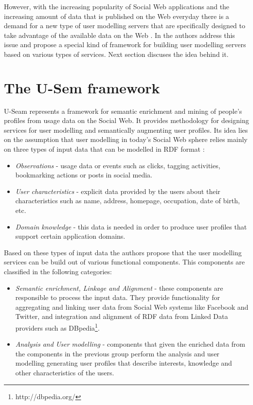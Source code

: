 However, with the increasing popularity of Social Web applications and the increasing amount of data that is published on the Web everyday there is a demand for a new type of user modelling servers that are specifically designed to take advantage of the available data on the Web \cite{brusilovsky2007adaptive}. In \cite{abel2011u} the authors address this issue and propose a special kind of framework for building user modelling servers based on various types of services. Next section discuses the idea behind it.

\section{The U-Sem framework}
U-Seam represents a framework for semantic enrichment and mining of people's profiles from usage data on the Social Web. It provides methodology for designing services for user modelling and semantically augmenting user profiles. Its idea lies on the assumption that user modelling in today's Social Web sphere relies mainly on three types of input data \cite{abel2011u} that can be modelled in RDF format \cite{miller1998introduction}:

\begin{itemize}
	\item \textit{Observations} - usage data or events such as clicks, tagging activities, bookmarking actions or posts in social media.
	
	\item \textit{User characteristics} - explicit data provided by the users about their characteristics such as name, address, homepage, occupation, date of birth, etc.
	
	\item \textit{Domain knowledge} - this data is needed in order to produce user profiles that support certain application domains.
\end{itemize}

Based on these types of input data the authors propose that the user modelling services can be build out of various functional components. This components are classified in the following categories:

\begin{itemize}
	\item \textit{Semantic enrichment, Linkage and Alignment} - these components are responsible to process the input data. They provide functionality for aggregating and linking user data from Social Web systems like Facebook and Twitter, and integration and alignment of RDF data from Linked Data providers such as DBpedia\footnote{http://dbpedia.org/}.
	
	\item \textit{Analysis and User modelling} - components that given the enriched data from the components in the previous group perform the analysis and user modelling generating user profiles that describe interests, knowledge and other characteristics of the users.
\end{itemize}

